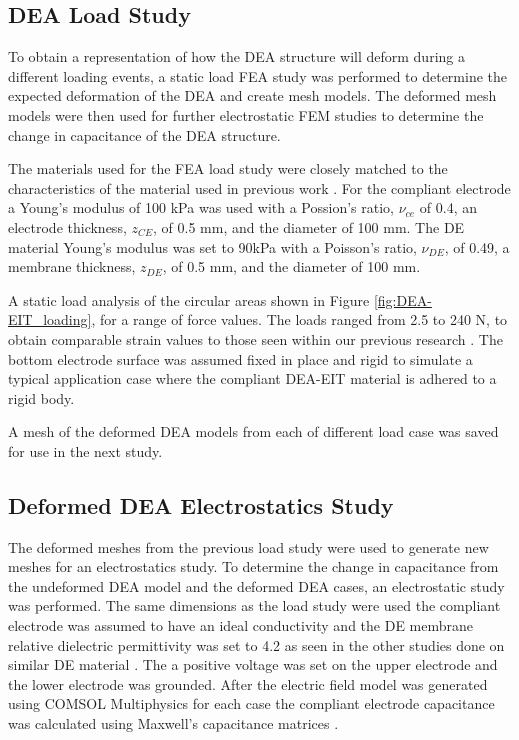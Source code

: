 \subsection{DEA Load Study}
To obtain a representation of how the DEA structure will deform during a different loading events, a static load FEA study was performed to determine the expected deformation of the DEA and create mesh models. The deformed mesh models were then used for further electrostatic FEM studies to determine the change in capacitance of the DEA structure.

The materials used for the FEA load study were closely matched to the characteristics of the material used in previous work \cite{Ellingham2024} . For the compliant electrode a Young's modulus of 100 kPa was used with a Possion's ratio, $\nu_{ce}$ of 0.4, an electrode thickness, $z_{CE}$, of 0.5 mm, and the diameter of 100 mm. The DE material Young's modulus was set to 90kPa with a Poisson's ratio, $\nu_{DE}$, of 0.49, a membrane thickness, $z_{DE}$, of 0.5 mm, and the diameter of 100 mm. 

A static load analysis of the circular areas shown in Figure \ref{fig:DEA-EIT_loading}, for a range of force values. The loads ranged from 2.5 to 240 N, to obtain comparable strain values to those seen within our previous research \cite{Ellingham2021,Ellingham2024} . The bottom electrode surface was assumed fixed in place and rigid to simulate a typical application case where the compliant DEA-EIT material is adhered to a rigid body.

A mesh of the deformed DEA models from each of different load case was saved for use in the next study.


\subsection{Deformed DEA Electrostatics Study}
The deformed meshes from the previous load study were used to generate new meshes for an electrostatics study. To determine the change in capacitance from the undeformed DEA model and the deformed DEA cases, an electrostatic study was performed. The same dimensions as the load study were used the compliant electrode was assumed to have an ideal conductivity and the DE membrane relative dielectric permittivity was set to 4.2 as seen in the other studies done on similar DE material \cite{Pan2015}. The a positive voltage was set on the upper electrode and the lower electrode was grounded. After the electric field model was generated using COMSOL Multiphysics \cite{COMSOL2022} for each case the compliant electrode capacitance was calculated using Maxwell's capacitance matrices \cite{Smolic2021} . 


